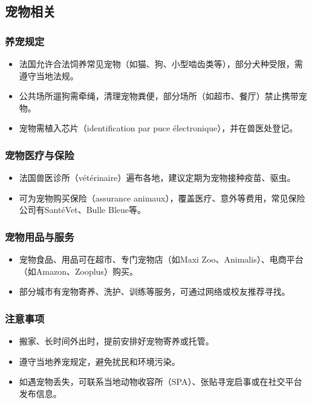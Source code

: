\subsection{宠物相关}

\subsubsection{养宠规定}
\begin{itemize}
    \item 法国允许合法饲养常见宠物（如猫、狗、小型啮齿类等），部分犬种受限，需遵守当地法规。
    \item 公共场所遛狗需牵绳，清理宠物粪便，部分场所（如超市、餐厅）禁止携带宠物。
    \item 宠物需植入芯片（identification par puce électronique），并在兽医处登记。
\end{itemize}

\subsubsection{宠物医疗与保险}
\begin{itemize}
    \item 法国兽医诊所（vétérinaire）遍布各地，建议定期为宠物接种疫苗、驱虫。
    \item 可为宠物购买保险（assurance animaux），覆盖医疗、意外等费用，常见保险公司有SantéVet、Bulle Bleue等。
\end{itemize}

\subsubsection{宠物用品与服务}
\begin{itemize}
    \item 宠物食品、用品可在超市、专门宠物店（如Maxi Zoo、Animalis）、电商平台（如Amazon、Zooplus）购买。
    \item 部分城市有宠物寄养、洗护、训练等服务，可通过网络或校友推荐寻找。
\end{itemize}

\subsubsection{注意事项}
\begin{itemize}
    \item 搬家、长时间外出时，提前安排好宠物寄养或托管。
    \item 遵守当地养宠规定，避免扰民和环境污染。
    \item 如遇宠物丢失，可联系当地动物收容所（SPA）、张贴寻宠启事或在社交平台发布信息。
\end{itemize}

